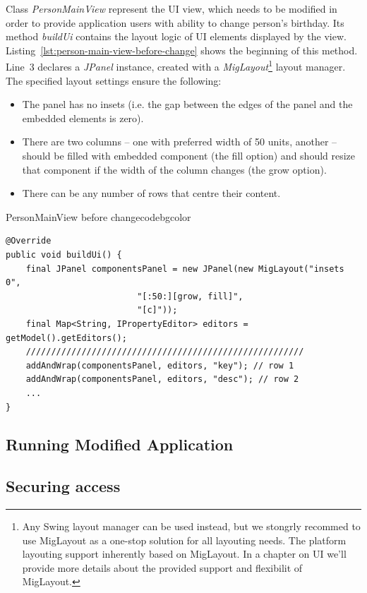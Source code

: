   Class \emph{PersonMainView} represent the UI view, which needs to be modified in order to provide application users with ability to change person's birthday.
  Its method \emph{buildUi} contains the layout logic of UI elements displayed by the view.
  Listing~\ref{lst:person-main-view-before-change} shows the beginning of this method.
  Line~3 declares a \emph{JPanel} instance, created with a \emph{MigLayout}\footnote{Any Swing layout manager can be used instead, but we stongrly recommed to use MigLayout as a one-stop solution for all layouting needs. 
	    The platform layouting support inherently based on MigLayout. 
	    In a chapter on UI we'll provide more details about the provided support and flexibilit of MigLayout.} 
  layout manager.
  The specified layout settings ensure the following:
  \begin{itemize}
    \item The panel has no insets (i.e. the gap between the edges of the panel and the embedded elements is zero).
    \item There are two columns -- one with preferred width of 50 units, another -- should be filled with embedded component (the fill option) and should resize that component if the width of the column changes (the grow option).
    \item There can be any number of rows that centre their content.
  \end{itemize}


 \begin{code}{PersonMainView before change}{\label{lst:person-main-view-before-change}}{codebgcolor}
    \begin{lstlisting}
@Override
public void buildUi() {
    final JPanel componentsPanel = new JPanel(new MigLayout("insets 0", 
						  "[:50:][grow, fill]", 
						  "[c]"));
    final Map<String, IPropertyEditor> editors = getModel().getEditors();
    ///////////////////////////////////////////////////////    
    addAndWrap(componentsPanel, editors, "key"); // row 1
    addAndWrap(componentsPanel, editors, "desc"); // row 2
    ...
}
    \end{lstlisting}
  \end{code}


\subsection{Running Modified Application}

\subsection{Securing access}